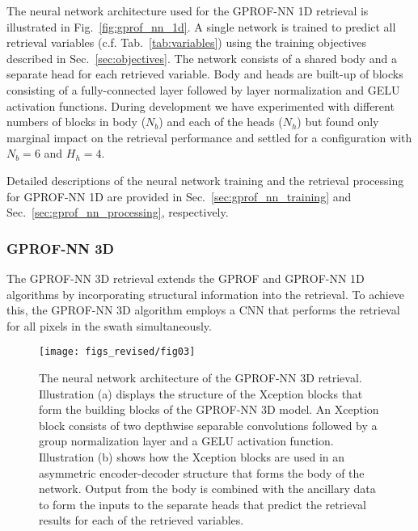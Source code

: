 \documentclass[journal abbreviation, manuscript]{copernicus}
\begin{document}
The neural network architecture used for the GPROF-NN 1D retrieval is
illustrated in Fig.~\ref{fig:gprof_nn_1d}. A single network is trained to
predict all retrieval variables (c.f. Tab.~\ref{tab:variables}) using the
training objectives described in Sec.~\ref{sec:objectives}. The network consists of
a shared body and a separate head for each retrieved variable. Body and heads
are built-up of blocks consisting of a fully-connected layer followed by layer
normalization \citep{ba16} and GELU \citep{hendrycks16} activation functions.
During development we have experimented with different numbers of blocks in body
($N_b$) and each of the heads ($N_h$) but found only marginal impact on the
retrieval performance and settled for a configuration with $N_b = 6$ and $H_h =
4$.


Detailed descriptions of the neural network training and the retrieval
processing for GPROF-NN 1D are provided in Sec.~\ref{sec:gprof_nn_training} and
Sec.~\ref{sec:gprof_nn_processing}, respectively.


\subsubsection{GPROF-NN 3D}

The GPROF-NN 3D retrieval extends the GPROF and GPROF-NN 1D algorithms by
incorporating structural information into the retrieval. To achieve this, the
GPROF-NN 3D algorithm employs a CNN that performs the retrieval for all pixels
in the swath simultaneously.

\begin{figure}[hbpt]
  \centering
  \texttt{[image: figs\_revised/fig03]}
  \caption{
    The neural network architecture of the GPROF-NN 3D retrieval. Illustration
    (a) displays the structure of the Xception blocks \citep{chollet17} that
    form the building blocks of the GPROF-NN 3D model. An Xception block
    consists of two depthwise separable convolutions followed by a group
    normalization layer and a GELU activation function. Illustration (b) shows
    how the Xception blocks are used in an asymmetric encoder-decoder structure
    that forms the body of the network. Output from the body is combined with
    the ancillary data to form the inputs to the separate heads that predict the
    retrieval results for each of the retrieved variables.
  }
  \label{fig:gprof_nn_3d_arch}
\end{figure}
\end{document}
